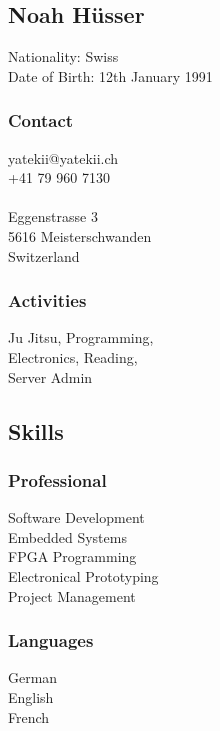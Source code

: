 \documentclass[]{resume}
\begin{document}

\begin{facts}
\section{Noah Hüsser}
\sectionsep
\sectionsep

Nationality: Swiss\\
Date of Birth: 12th January 1991
\sectionsep

\subsubsection{Contact}
yatekii@yatekii.ch\\
+41 79 960 7130\\
\\
Eggenstrasse 3\\
5616 Meisterschwanden\\
Switzerland
\sectionsep

\subsubsection{Activities}
Ju Jitsu, Programming,\\
Electronics, Reading,\\
Server Admin
\sectionsep


\subsection{Skills}

\subsubsection{Professional}
Software Development\\
Embedded Systems\\
FPGA Programming\\
Electronical Prototyping\\
Project Management
\sectionsep

\subsubsection{Languages}
German \\
English \\
French 
\sectionsep


\end{facts}
\end{document}
